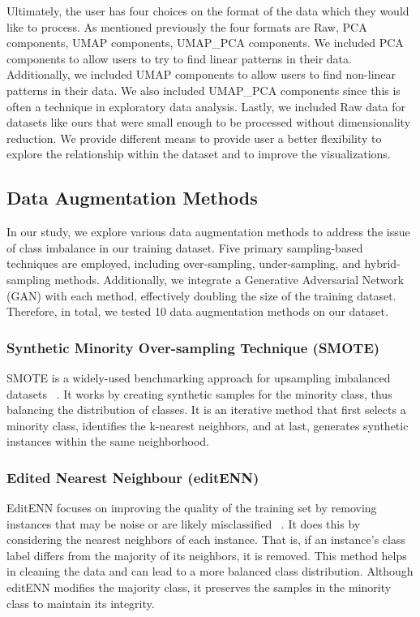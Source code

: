 Ultimately, the user has four choices on the format of the data which they would like to process. As mentioned previously the four formats are Raw, PCA components, UMAP components, UMAP\_PCA components. We included PCA components to allow users to try to find linear patterns in their data. Additionally, we included UMAP components to allow users to find non-linear patterns in their data. We also included UMAP\_PCA components since this is often a technique in exploratory data analysis. Lastly, we included Raw data for datasets like ours that were small enough to be processed without dimensionality reduction. We provide different means to provide user a better flexibility to explore the relationship within the dataset and to improve the visualizations. 

\subsection{Data Augmentation Methods}
In our study, we explore various data augmentation methods to address the issue of class imbalance in our training dataset. Five primary sampling-based techniques are employed, including over-sampling, under-sampling, and hybrid-sampling methods. Additionally, we integrate a Generative Adversarial Network (GAN) with each method, effectively doubling the size of the training dataset. Therefore, in total, we tested 10 data augmentation methods on our dataset.

\subsubsection{Synthetic Minority Over-sampling Technique (SMOTE)}
SMOTE is a widely-used benchmarking approach for upsampling imbalanced datasets ~\cite{SMOTE_Kegelmeyer_2002}. It works by creating synthetic samples for the minority class, thus balancing the distribution of classes. It is an iterative method that first selects a minority class, identifies the k-nearest neighbors, and at last, generates synthetic instances within the same neighborhood.

\subsubsection{Edited Nearest Neighbour (editENN)}
EditENN focuses on improving the quality of the training set by removing instances that may be noise or are likely misclassified ~\cite{Wilson_1972}. It does this by considering the nearest neighbors of each instance. That is, if an instance's class label differs from the majority of its neighbors, it is removed. This method helps in cleaning the data and can lead to a more balanced class distribution. Although editENN modifies the majority class, it preserves the samples in the minority class to maintain its integrity.

